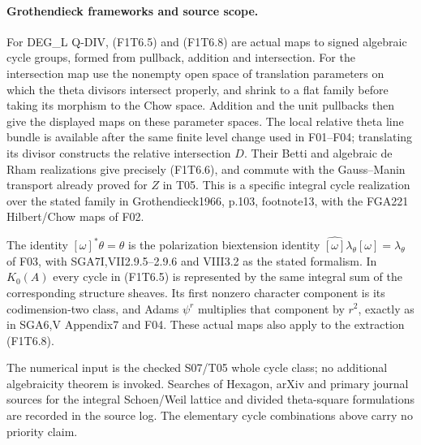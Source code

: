 \paragraph{Grothendieck frameworks and source scope.}
For DEG\_L Q-DIV, (F1T6.5) and (F1T6.8) are actual maps
to signed algebraic cycle groups, formed from pullback, addition
and intersection. For the intersection map use the nonempty
open space of translation parameters on which the theta divisors
intersect properly, and shrink to a flat family before taking
its morphism to the Chow space. Addition and the unit pullbacks
then give the displayed maps on these parameter spaces.
The local relative theta line bundle is available after the
same finite level change used in F01--F04; translating its
divisor constructs the relative intersection $D$. Their
Betti and algebraic de Rham realizations give precisely
(F1T6.6), and commute with the Gauss--Manin transport already
proved for $Z$ in T05. This is a specific integral cycle
realization over the stated family in Grothendieck1966,
p.103, footnote13, with the FGA221 Hilbert/Chow maps of F02.

The identity $[\omega]^*\theta=\theta$ is the polarization
biextension identity
$\widehat{[\omega]}\lambda_\theta[\omega]=\lambda_\theta$
of F03, with SGA7I,VII2.9.5--2.9.6 and VIII3.2 as the stated
formalism. In $K_0(A)$ every cycle in (F1T6.5) is represented
by the same integral sum of the corresponding structure
sheaves. Its first nonzero character component is its
codimension-two class, and Adams $\psi^r$ multiplies that
component by $r^2$, exactly as in SGA6,V Appendix7 and F04.
These actual maps also apply to the extraction (F1T6.8).

The numerical input is the checked S07/T05 whole cycle class;
no additional algebraicity theorem is invoked. Searches of
Hexagon, arXiv and primary journal sources for the integral
Schoen/Weil lattice and divided theta-square formulations are
recorded in the source log. The elementary cycle combinations
above carry no priority claim.
